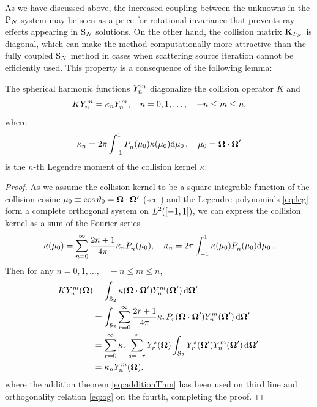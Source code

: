 As we have discussed above, the increased coupling between the
unknowns in the $\PN$ system may be seen as a price for rotational invariance
that prevents ray effects appearing in $\SN$ solutions. On the other hand, the collision matrix $\mat{K}_{P_N}$ is
diagonal, which can make the method computationally more attractive than the fully coupled $\SN$ method in cases when 
scattering source iteration cannot be efficiently used. This property is a consequence of the following lemma:

\begin{lemma}\label{lem:appC}
The spherical harmonic functions $\Y{n}{m}$ diagonalize the collision operator $K$ and
$$
	K\Y{n}{m} = \kappa_n \Y{n}{m},\quad n = 0,1,\ldots,\quad -n \leq m \leq n,
$$
where
$$
	\kappa_n = 2\pi \muint[_0]{\P{n}{}(\mu_0)\kappa(\mu_0)},\quad \mu_0 = \bomega\cdot\bomega'
$$
is the $n$-th Legendre moment of the collision kernel $\kappa$.
\end{lemma}  
\begin{proof}
	As we assume the collision kernel to be a square integrable function of the collision cosine  
	$\mu_0 \equiv \cos \polar_0 = \bomega\cdot\bomega'$ (see )
	and the Legendre polynomials \eqref{eq:leg} form a complete orthogonal system on $\Lp[2]([-1,1])$, we can express the
	collision kernel as a sum of the Fourier series
	$$
		\kappa(\mu_0) = \suma[n]{0}{\infty}\frac{2n+1}{4\pi}\kappa_n\P{n}{}(\mu_0),\quad
		\kappa_n = 2\pi \muint[_0]{\kappa(\mu_0)\P{n}{}(\mu_0)}.
	$$
	Then for any $n = 0,1,\ldots,\quad -n \leq m \leq n$,
	$$
\begin{aligned}
	K\Y{n}{m}(\bomega) &= \intA[']{\kappa(\bomega\cdot\bomega')\Y{n}{m}(\bomega')} \\
	&= \intA[']{\suma[r]{0}{\infty}\frac{2r+1}{4\pi}\kappa_r\P{r}{}(\bomega\cdot\bomega')\Y{n}{m}(\bomega')} \\
	&= \suma[r]{0}{\infty}\kappa_r\suma[s]{-r}{r}\Y{r}{s}(\bomega)\intA[']{\Y{r}{s}(\bomega')\Y{n}{m}(\bomega')} \\
	&= \kappa_n\Y{n}{m}(\bomega).
\end{aligned}
	$$
	where the addition theorem \eqref{eq:additionThm} has been used on third line and orthogonality relation \eqref{eq:og}
	on the fourth, completing the proof.
\end{proof}

